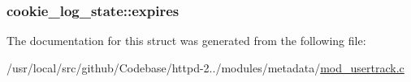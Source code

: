 \subsubsection[{\texorpdfstring{expires}{expires}}]{ cookie\+\_\+log\+\_\+state\+::expires}\hypertarget{structcookie__log__state_aa88e73d6f724fa7a5dc61c1b729b3df1}{}\label{structcookie__log__state_aa88e73d6f724fa7a5dc61c1b729b3df1}


The documentation for this struct was generated from the following file\+:\begin{DoxyCompactItemize}
\item 
/usr/local/src/github/\+Codebase/httpd-\/2../modules/metadata/\hyperlink{mod__usertrack_8c}{mod\+\_\+usertrack.\+c}\end{DoxyCompactItemize}
